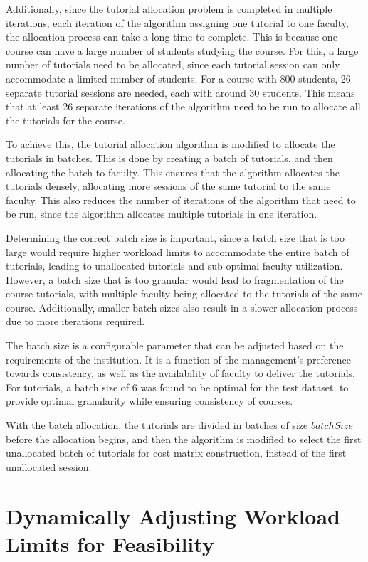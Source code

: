 Additionally, since the tutorial allocation problem is completed in multiple iterations, each iteration of the algorithm assigning one tutorial to one faculty, the allocation process can take a long time to complete. This is because one course can have a large number of students studying the course. For this, a large number of tutorials need to be allocated, since each tutorial session can only accommodate a limited number of students. For a course with 800 students, 26 separate tutorial sessions are needed, each with around 30 students. This means that at least 26 separate iterations of the algorithm need to be run to allocate all the tutorials for the course.

To achieve this, the tutorial allocation algorithm is modified to allocate the tutorials in batches. This is done by creating a batch of tutorials, and then allocating the batch to faculty. This ensures that the algorithm allocates the tutorials densely, allocating more sessions of the same tutorial to the same faculty. This also reduces the number of iterations of the algorithm that need to be run, since the algorithm allocates multiple tutorials in one iteration.

Determining the correct batch size is important, since a batch size that is too large would require higher workload limits to accommodate the entire batch of tutorials, leading to unallocated tutorials and sub-optimal faculty utilization. However, a batch size that is too granular would lead to fragmentation of the course tutorials, with multiple faculty being allocated to the tutorials of the same course. Additionally, smaller batch sizes also result in a slower allocation process due to more iterations required.

The batch size is a configurable parameter that can be adjusted based on the requirements of the institution. It is a function of the management's preference towards consistency, as well as the availability of faculty to deliver the tutorials. For tutorials, a batch size of 6 was found to be optimal for the test dataset, to provide optimal granularity while ensuring consistency of courses.

With the batch allocation, the tutorials are divided in batches of size $batchSize$ before the allocation begins, and then the algorithm is modified to select the first unallocated batch of tutorials for cost matrix construction, instead of the first unallocated session.


\section{Dynamically Adjusting Workload Limits for Feasibility}

